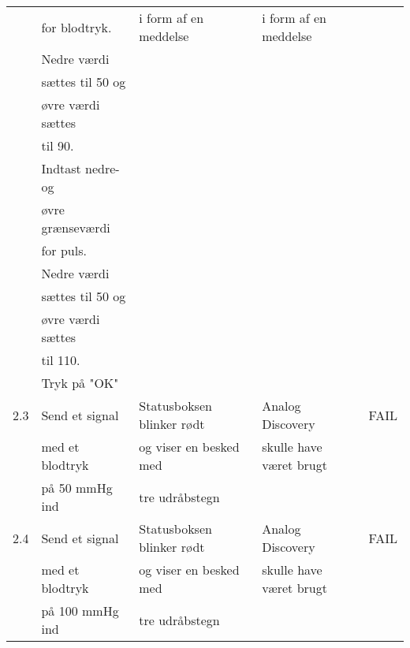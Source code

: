 \begin{table}[h!]
\begin{tabular}{lllll}
		\multicolumn{1}{l|}{} & \multicolumn{1}{l|}{for blodtryk.} & \multicolumn{1}{l|}{i form af en meddelse} & \multicolumn{1}{l|}{i form af en meddelse} &  \\
		\multicolumn{1}{l|}{} & \multicolumn{1}{l|}{Nedre værdi} & \multicolumn{1}{l|}{} & \multicolumn{1}{l|}{} &  \\
		\multicolumn{1}{l|}{} & \multicolumn{1}{l|}{sættes til 50 og} & \multicolumn{1}{l|}{} & \multicolumn{1}{l|}{} &  \\
		\multicolumn{1}{l|}{} & \multicolumn{1}{l|}{øvre værdi sættes} & \multicolumn{1}{l|}{} & \multicolumn{1}{l|}{} &  \\
		\multicolumn{1}{l|}{} & \multicolumn{1}{l|}{til 90.} & \multicolumn{1}{l|}{} & \multicolumn{1}{l|}{} &  \\
		\multicolumn{1}{l|}{} & \multicolumn{1}{l|}{Indtast nedre- og} & \multicolumn{1}{l|}{} & \multicolumn{1}{l|}{} &  \\
		\multicolumn{1}{l|}{} & \multicolumn{1}{l|}{øvre grænseværdi} & \multicolumn{1}{l|}{} & \multicolumn{1}{l|}{} &  \\
		\multicolumn{1}{l|}{} & \multicolumn{1}{l|}{for puls.} & \multicolumn{1}{l|}{} & \multicolumn{1}{l|}{} &  \\
		\multicolumn{1}{l|}{} & \multicolumn{1}{l|}{Nedre værdi} & \multicolumn{1}{l|}{} & \multicolumn{1}{l|}{} &  \\
		\multicolumn{1}{l|}{} & \multicolumn{1}{l|}{sættes til 50 og} & \multicolumn{1}{l|}{} & \multicolumn{1}{l|}{} &  \\
		\multicolumn{1}{l|}{} & \multicolumn{1}{l|}{øvre værdi sættes} & \multicolumn{1}{l|}{} & \multicolumn{1}{l|}{} &  \\
		\multicolumn{1}{l|}{} & \multicolumn{1}{l|}{til 110.} & \multicolumn{1}{l|}{} & \multicolumn{1}{l|}{} &  \\
		\multicolumn{1}{l|}{} & \multicolumn{1}{l|}{Tryk på "OK"} & \multicolumn{1}{l|}{} & \multicolumn{1}{l|}{} &  \\ \hline
		\multicolumn{1}{l|}{2.3} & \multicolumn{1}{l|}{Send et signal} & \multicolumn{1}{l|}{Statusboksen blinker rødt} & \multicolumn{1}{l|}{Analog Discovery} & FAIL \\
		\multicolumn{1}{l|}{} & \multicolumn{1}{l|}{med et blodtryk} & \multicolumn{1}{l|}{og viser en besked med} & \multicolumn{1}{l|}{skulle have været brugt} &  \\
		\multicolumn{1}{l|}{} & \multicolumn{1}{l|}{på 50 mmHg ind} & \multicolumn{1}{l|}{tre udråbstegn} & \multicolumn{1}{l|}{} &  \\ \hline
		\multicolumn{1}{l|}{2.4} & \multicolumn{1}{l|}{Send et signal} & \multicolumn{1}{l|}{Statusboksen blinker rødt} & \multicolumn{1}{l|}{Analog Discovery} & FAIL \\
		\multicolumn{1}{l|}{} & \multicolumn{1}{l|}{med et blodtryk} & \multicolumn{1}{l|}{og viser en besked med} & \multicolumn{1}{l|}{skulle have været brugt} &  \\
		\multicolumn{1}{l|}{} & \multicolumn{1}{l|}{på 100 mmHg ind} & \multicolumn{1}{l|}{tre udråbstegn} & \multicolumn{1}{l|}{} & 
	\end{tabular}
\end{table}

